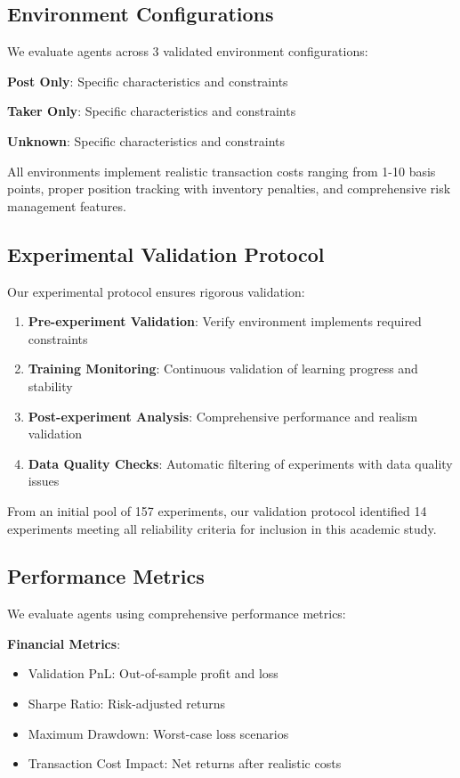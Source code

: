 \documentclass[11pt,a4paper]{article}
\begin{document}
\subsection{Environment Configurations}

We evaluate agents across 3 validated environment configurations:
\item \textbf{Post Only}: Specific characteristics and constraints
\item \textbf{Taker Only}: Specific characteristics and constraints
\item \textbf{Unknown}: Specific characteristics and constraints

All environments implement realistic transaction costs ranging from 1-10 basis points, proper position tracking with inventory penalties, and comprehensive risk management features.

\subsection{Experimental Validation Protocol}

Our experimental protocol ensures rigorous validation:

\begin{enumerate}
\item \textbf{Pre-experiment Validation}: Verify environment implements required constraints
\item \textbf{Training Monitoring}: Continuous validation of learning progress and stability
\item \textbf{Post-experiment Analysis}: Comprehensive performance and realism validation
\item \textbf{Data Quality Checks}: Automatic filtering of experiments with data quality issues
\end{enumerate}

From an initial pool of 157 experiments, our validation protocol identified 14 experiments meeting all reliability criteria for inclusion in this academic study.

\subsection{Performance Metrics}

We evaluate agents using comprehensive performance metrics:

\textbf{Financial Metrics}:
\begin{itemize}
\item Validation PnL: Out-of-sample profit and loss
\item Sharpe Ratio: Risk-adjusted returns
\item Maximum Drawdown: Worst-case loss scenarios
\item Transaction Cost Impact: Net returns after realistic costs
\end{itemize}
\end{document}
